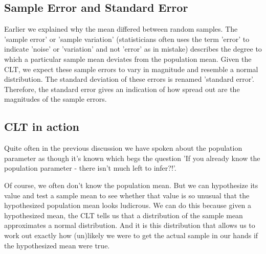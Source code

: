 \documentclass[a4paper,twosided,notoc]{tufte-book}
\begin{document}
\subsection{Sample Error and Standard Error}

Earlier we explained why the mean differed between random samples. The 'sample error' or 'sample variation' (statisticians often uses the term 'error' to indicate 'noise' or 'variation' and not 'error' as in mistake) describes the degree to which a particular sample mean deviates from the population mean. Given the CLT, we expect these sample errors to vary in magnitude and resemble a normal distribution. The standard deviation of these errors is renamed 'standard error'. Therefore, the standard error gives an indication of how spread out are the magnitudes of the sample errors.

\subsection{CLT in action}
Quite often in the previous discussion we have spoken about the population parameter as though it's known which begs the question 'If you already know the population parameter - there isn't much left to infer?!'. 

Of course, we often don't know the population mean. But we can hypothesize its value and test a sample mean to see whether that value is so unusual that the hypothesized population mean looks ludicrous. We can do this because given a hypothesized mean, the CLT tells us that a distribution of the sample mean approximates a normal distribution. And it is this distribution that allows us to work out exactly how (un)likely we were to get the actual sample in our hands if the hypothesized mean were true. 
\end{document}
